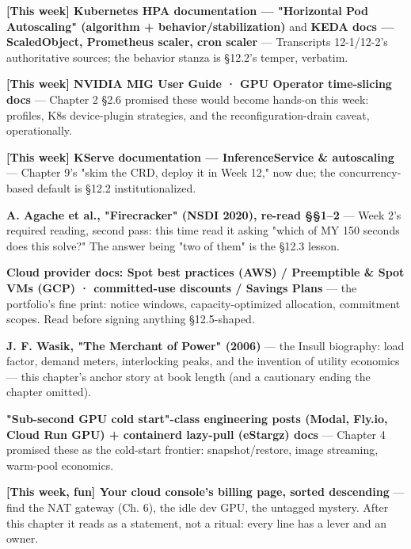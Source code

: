 \begin{tbbitemize}
  \item \textbf{[This week] Kubernetes HPA documentation — "Horizontal Pod Autoscaling" (algorithm + behavior/stabilization)} and \textbf{KEDA docs — ScaledObject, Prometheus scaler, cron scaler} — Transcripts 12-1/12-2's authoritative sources; the behavior stanza is §12.2's temper, verbatim.
  \item \textbf{[This week] NVIDIA MIG User Guide · GPU Operator time-slicing docs} — Chapter 2 §2.6 promised these would become hands-on this week: profiles, K8s device-plugin strategies, and the reconfiguration-drain caveat, operationally.
  \item \textbf{[This week] KServe documentation — InferenceService \& autoscaling} — Chapter 9's "skim the CRD, deploy it in Week 12," now due; the concurrency-based default is §12.2 institutionalized.
  \item \textbf{A. Agache et al., "Firecracker" (NSDI 2020), re-read §§1–2} — Week 2's required reading, second pass: this time read it asking "which of MY 150 seconds does this solve?" The answer being "two of them" is the §12.3 lesson.
  \item \textbf{Cloud provider docs: Spot best practices (AWS) / Preemptible \& Spot VMs (GCP) · committed-use discounts / Savings Plans} — the portfolio's fine print: notice windows, capacity-optimized allocation, commitment scopes. Read before signing anything §12.5-shaped.
  \item \textbf{J. F. Wasik, "The Merchant of Power" (2006)} — the Insull biography: load factor, demand meters, interlocking peaks, and the invention of utility economics — this chapter's anchor story at book length (and a cautionary ending the chapter omitted).
  \item \textbf{"Sub-second GPU cold start"-class engineering posts (Modal, Fly.io, Cloud Run GPU) + containerd lazy-pull (eStargz) docs} — Chapter 4 promised these as the cold-start frontier: snapshot/restore, image streaming, warm-pool economics.
  \item \textbf{[This week, fun] Your cloud console's billing page, sorted descending} — find the NAT gateway (Ch. 6), the idle dev GPU, the untagged mystery. After this chapter it reads as a statement, not a ritual: every line has a lever and an owner.
\end{tbbitemize}

\vspace{5.0pt}

